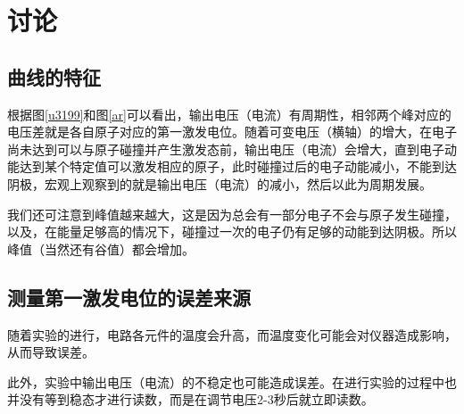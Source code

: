 \documentclass{ctexart}
\begin{document}
	\section{讨论}
	\subsection{曲线的特征}
	根据图\ref{u3199}和图\ref{ar}可以看出，输出电压（电流）有周期性，相邻两个峰对应的电压差就是各自原子对应的第一激发电位。随着可变电压（横轴）的增大，在电子尚未达到可以与原子碰撞并产生激发态前，输出电压（电流）会增大，直到电子动能达到某个特定值可以激发相应的原子，此时碰撞过后的电子动能减小，不能到达阴极，宏观上观察到的就是输出电压（电流）的减小，然后以此为周期发展。
	
	我们还可注意到峰值越来越大，这是因为总会有一部分电子不会与原子发生碰撞，以及，在能量足够高的情况下，碰撞过一次的电子仍有足够的动能到达阴极。所以峰值（当然还有谷值）都会增加。
	\subsection{测量第一激发电位的误差来源}
	随着实验的进行，电路各元件的温度会升高，而温度变化可能会对仪器造成影响，从而导致误差。
	
	此外，实验中输出电压（电流）的不稳定也可能造成误差。在进行实验的过程中也并没有等到稳态才进行读数，而是在调节电压2-3秒后就立即读数。
	\newpage
\end{document}
